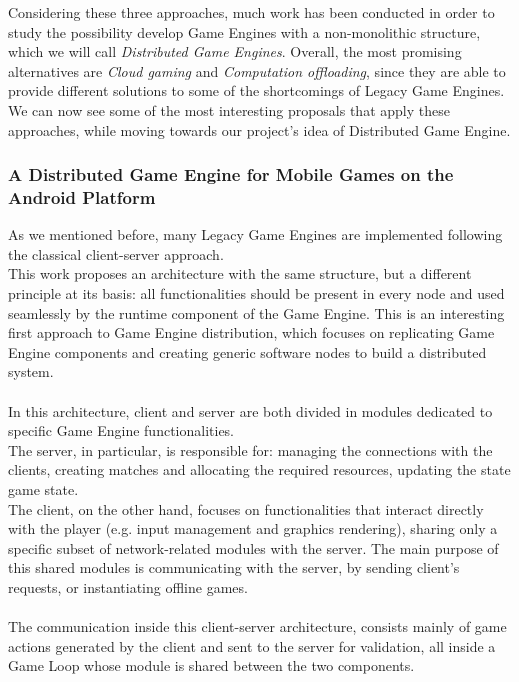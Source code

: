 Considering these three approaches, much work \cite{womak:distributed-architecture-interactive-multiplayer, womak:distributed-cloud-gaming-pipeline, womak:distributed-game-engine-android} has been conducted in order to study the possibility develop Game Engines with a non-monolithic structure, which we will call \textit{Distributed Game Engines}.
Overall, the most promising alternatives are \textit{Cloud gaming} and \textit{Computation offloading}, since they are able to provide different solutions to some of the shortcomings of Legacy Game Engines. \\
We can now see some of the most interesting proposals that apply these approaches, while moving towards our project's idea of Distributed Game Engine.
\subsubsection{A Distributed Game Engine for Mobile Games on the Android Platform \cite{womak:distributed-game-engine-android}}
As we mentioned before, many Legacy Game Engines are implemented following the classical client-server approach. \\ 
This work proposes an architecture with the same structure, but a different principle at its basis: all functionalities should be present in every node and used seamlessly by the runtime component of the Game Engine. This is an interesting first approach to Game Engine distribution, which focuses on replicating Game Engine components and creating generic software nodes to build a distributed system. \\ \\
In this architecture, client and server are both divided in modules dedicated to specific Game Engine functionalities. \\ 
The server, in particular, is responsible for: managing the connections with the clients, creating matches and allocating the required resources, updating the state game state. \\
The client, on the other hand, focuses on functionalities that interact directly with the player (e.g. input management and graphics rendering), sharing only a specific subset of network-related modules with the server. The main purpose of this shared modules is communicating with the server, by sending client's requests, or instantiating offline games. \\ \\
The communication inside this client-server architecture, consists mainly of game actions generated by the client and sent to the server for validation, all inside a Game Loop whose module is shared between the two components.
